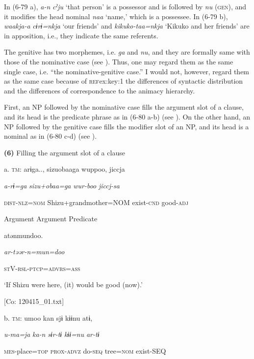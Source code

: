 In (6-79 a), \textit{a-n} \textit{cˀju} ‘that person’ is a possessor and is followed by \textit{nu} (\textsc{gen}), and it modifies the head nominal \textit{naa} ‘name,’ which is a possessee. In (6-79 b), \textit{waakja-a} \textit{cɨrɨ=nkja} ‘our friends’ and \textit{kikuko-taa=nkja} ‘Kikuko and her friends’ are in apposition, i.e., they indicate the same referents.

The genitive has two morphemes, i.e. \textit{ga} and \textit{nu}, and they are formally same with those of the nominative case (see ). Thus, one may regard them as the same single case, i.e. “the nominative-genitive case.” I would not, however, regard them as the same case because of \textsc{ref}{ex:key:1} the differences of syntactic distribution and  the differences of correspondence to the animacy hierarchy.

First, an NP followed by the nominative case fills the argument slot of a clause, and its head is the predicate phrase as in (6-80 a-b) (see ). On the other hand, an NP followed by the genitive case fills the modifier slot of an NP, and its head is a nominal as in (6-80 c-d) (see ).

\textbf{(6)}  Filling the argument slot of a clause

  a.  \textsc{tm}:  arɨga..,  sizuobaaga  wuppoo,  jiccja

      \textit{a-rɨ=ga}  \textit{sizu+obaa=ga}  \textit{wur-boo}  \textit{jiccj-sa}

      \textsc{dist}-\textsc{nlz}=\textsc{nom}  Shizu+grandmother=NOM  exist-\textsc{cnd}  good-\textsc{adj}

      Argument  Argument  Predicate  

      atənmundoo.

      \textit{ar-təər-n=mun=doo}

      \textsc{st}V-\textsc{rsl}-\textsc{ptcp}=\textsc{advrs}=\textsc{ass}

      ‘If Shizu were here, (it) would be good (now).’

      [Co: 120415\_01.txt]

  b.  \textsc{tm}:  umoo  kan  sjɨ  kɨɨnu  atɨ,

      \textit{u-ma=ja}  \textit{ka-n}  \textit{sɨr-tɨ}  \textit{kɨɨ=nu}  \textit{ar-tɨ}

      \textsc{mes}-place=\textsc{top}  \textsc{prox}-\textsc{advz}  do-\textsc{seq}  tree=\textsc{nom}  exist-SEQ

